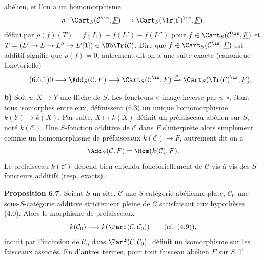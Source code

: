 abélien, et l'on a un homomorphisme
\[
  \rho:\Cart_S(\mathcal C^{\is},\underline F)
  \longrightarrow
  \Cart_S(\Tr(\mathcal C)^{\is},\underline F),
\]
défini par \(\rho(f)(T)=f(L)-f(L')-f(L'')\) pour \(f\in\Cart_S(\mathcal C^{\is},\underline F)\) et \(T=(L'\to L\to L''\to L'[1])\in\Ob\Tr(\mathcal C)\). Dire que \(f\in\Cart_S(\mathcal C^{\is},\underline F)\) est additif signifie que \(\rho(f)=0\), autrement dit on a une suite exacte (canonique fonctorielle)
\begin{equation}\tag{6.6.1}
  0\longrightarrow \Add_S(\mathcal C,F)
  \longrightarrow \Cart_S(\mathcal C^{\is},\underline F)
  \xrightarrow{\rho}
  \Cart_S(\Tr(\mathcal C)^{\is},\underline F).
\end{equation}

\textbf{b)} Soit \(u:X\to Y\) une flèche de \(S\). Les foncteurs « image inverse par \(u\) », étant tous isomorphes entre eux, définissent (6.3) un unique homomorphisme \(k(Y)\longrightarrow k(X)\). Par suite, \(X\mapsto k(X)\) définit un préfaisceau abélien sur \(S\), noté \(k(\mathcal C)\). Une \(S\)-fonction additive de \(\mathcal C\) dans \(F\) s'interprète alors simplement comme un homomorphisme de préfaisceaux \(k(\mathcal C)\longrightarrow F\), autrement dit on a
\[
  \Add_S(\mathcal C,F)=\Hom(k(\mathcal C),F).
\]
Le préfaisceau \(k(\mathcal C)\) dépend bien entendu fonctoriellement de \(\mathcal C\) vis-à-vis des \(S\)-foncteurs additifs (resp. exacts).

\textbf{Proposition 6.7.} Soient \(S\) un site, \(\mathcal C\) une \(S\)-catégorie abélienne plate, \(\mathcal C_0\) une sous-\(S\)-catégorie additive strictement pleine de \(\mathcal C\) satisfaisant aux hypothèses (4.0). Alors le morphisme de préfaisceaux
\[
  k(\mathcal C_0)\longrightarrow k(\Parf(\mathcal C,\mathcal C_0))\qquad(\text{cf. }(4.9)),
\]
induit par l'inclusion de \(\mathcal C_0\) dans \(\Parf(\mathcal C,\mathcal C_0)\), définit un isomorphisme sur les faisceaux associés. En d'autres termes, pour tout faisceau abélien \(F\) sur \(S\), l'%

